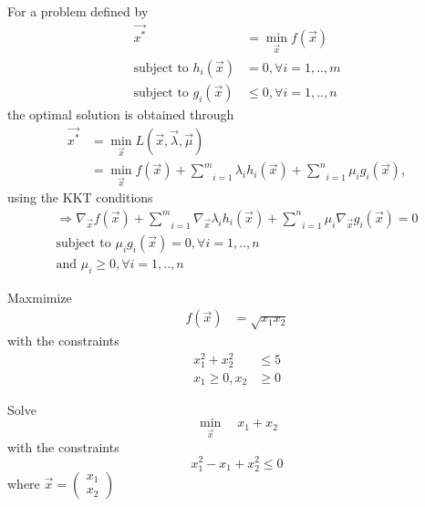 \documentclass[journal,12pt,twocolumn]{IEEEtran}
\begin{document}
\solution For a problem defined by 
\begin{align}
\vec{x^*} &= \min_{\vec{x}}f(\vec{x})
\\
\text{subject to } h_i(\vec{x}) &= 0, \forall i=1,..,m
\\
\text{subject to } g_i(\vec{x}) &\le 0, \forall i=1,..,n
\end{align}
%
the optimal solution is obtained through
%
\begin{align}
\vec{x^*} &= \min_{\vec{x}}L(\vec{x}, \vec{\lambda}, \vec{\mu}) 
\\
&= \min_{\vec{x}}f(\vec{x})  + \underset{i=1}{\overset{m}{\sum}} \lambda_i h_i(\vec{x}) + \underset{i=1}{\overset{n}{\sum}} \mu_i g_i(\vec{x}),
\end{align}
%
using the KKT conditions
%
\begin{align}
\Rightarrow \nabla_\vec{x} f(\vec{x})  + \underset{i=1}{\overset{m}{\sum}} \nabla_\vec{x} \lambda_i h_i(\vec{x}) + \underset{i=1}{\overset{n}{\sum}} \mu_i \nabla_\vec{x} g_i(\vec{x}) = 0 
\\
\text{subject to }\mu_i g_i(\vec{x}) = 0, \forall i = 1,..,n
\\
\text{and }\mu_i \ge 0, \forall i = 1,..,n
\end{align}
%
\item
	Maxmimize 
	\begin{align}
	f(\vec{x}) &= \sqrt{x_1x_2}
	\end{align}
	with the constraints
	\begin{align}
	x_1^2+x_2^2 &\leq 5 \\
	x_1 \geq 0, x_2 &\geq 0
	\end{align}

%
\item
	\label{convex_sdp_eqiv}
	Solve
	\begin{equation}
	\min_{\vec{x}} \quad x_1 + x_2
	\end{equation}
	with the constraints
	\begin{equation}
	x_1^2 - x_1 + x_2^2 \leq 0
	\end{equation}
where 
$
\vec{x} = \begin{pmatrix}
x_1 \\
x_2
\end{pmatrix}
$
\end{document}
